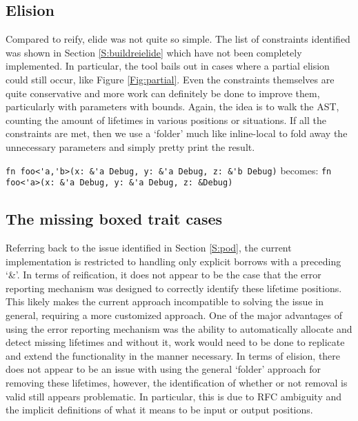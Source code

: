 \subsection{Elision}

Compared to reify, elide was not quite so simple. The list of constraints identified was shown in Section \ref{S:buildreielide} which have not been completely implemented. In particular, the tool bails out in cases where a partial elision could still occur, like Figure \ref{Fig:partial}. Even the constraints themselves are quite conservative and more work can definitely be done to improve them, particularly with parameters with bounds. Again, the idea is to walk the AST, counting the amount of lifetimes in various positions or situations. If all the constraints are met, then we use a `folder' much like inline-local to fold away the unnecessary parameters and simply pretty print the result.

\begin{fig}
{\verb|fn foo<'a,'b>(x: &'a Debug, y: &'a Debug, z: &'b Debug)|}\newline
becomes: {\verb|fn foo<'a>(x: &'a Debug, y: &'a Debug, z: &Debug)|}
\caption{Partial elision -- only \emph{'b} removed}
\label{Fig:partial}
\end{fig}


\subsection{The missing boxed trait cases}
Referring back to the issue identified in Section \ref{S:pod}, the current implementation is restricted to handling only explicit borrows with a preceding `\&'. In terms of reification, it does not appear to be the case that the error reporting mechanism was designed to correctly identify these lifetime positions. This likely makes the current approach incompatible to solving the issue in general, requiring a more customized approach. One of the major advantages of using the error reporting mechanism was the ability to automatically allocate and detect missing lifetimes and without it, work would need to be done to replicate and extend the functionality in the manner necessary. In terms of elision, there does not appear to be an issue with using the general `folder' approach for removing these lifetimes, however, the identification of whether or not removal is valid still appears problematic. In particular, this is due to RFC ambiguity and the implicit definitions of what it means to be input or output positions.




